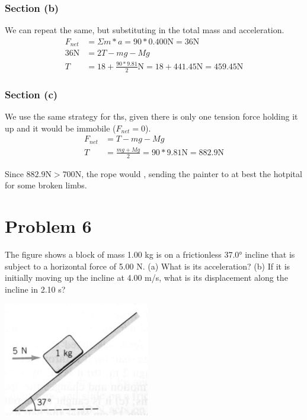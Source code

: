 \documentclass[12pt]{article}
\begin{document}
\subsubsection*{Section (b)}
We can repeat the same, but substituting in the total mass and acceleration.
\begin{align*}
    F_{net} &= \Sigma m * a = 90 * 0.400 \unit{\newton} = 36 \unit{\newton}\\
    36 \unit{\newton} &= 2T - mg - Mg\\
    T &= 18 + \frac{90*9.81}{2} \unit{\newton} 
        = 18 + 441.45 \unit{\newton} 
        = \boxed{459.45 \unit{\newton}}
\end{align*}

\pagebreak
\subsubsection{Section (c)}
We use the same strategy for ths, given there is only one tension force holding it up and it would be immobile ($F_{net} = 0$).
\begin{align*}
    F_{net} &= T - mg - Mg\\
    T &= \frac{mg + Mg}{2} = 90*9.81\unit{\newton} = \boxed{882.9 \unit{\newton}}
\end{align*}

Since $882.9\unit{\newton} > 700\unit{\newton}$, the rope would , sending the painter to at best the hotpital for some broken limbs.

\pagebreak
\section*{Problem 6}
The figure shows a block of mass 1.00 kg is on a frictionless 37.0\unit{\degree} incline that is subject to a horizontal force of 5.00 N. (a) What is its acceleration? (b) If it is initially moving up the incline at 4.00 m/s, what is its displacement along the incline in 2.10 s?

\begin{center}
    \includegraphics*[height=5cm]{graph_6.png}
\end{center}
\end{document}

